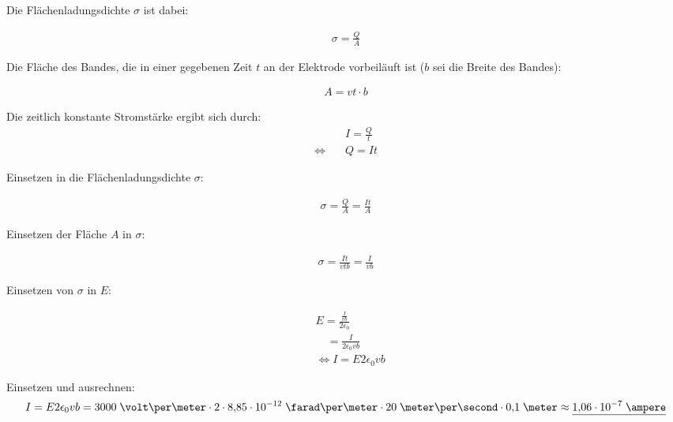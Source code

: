 \documentclass[a4paper,german,12pt,smallheadings]{scrartcl}
\begin{document}
Die Flächenladungsdichte $\sigma$ ist dabei:

\begin{align*}
  \sigma = \frac{Q}{A}
\end{align*}

Die Fläche des Bandes, die in einer gegebenen Zeit $t$ an der Elektrode
vorbeiläuft ist ($b$ sei die Breite des Bandes):

\begin{align*}
  A = vt \cdot b
\end{align*}

Die zeitlich konstante Stromstärke ergibt sich durch:
\begin{align*}
  &I = \frac{Q}{t} \\
  \Leftrightarrow \quad &Q = It
\end{align*}

Einsetzen in die Flächenladungsdichte $\sigma$:

\begin{align*}
  \sigma = \frac{Q}{A} = \frac{It}{A}
\end{align*}

Einsetzen der Fläche $A$ in $\sigma$:

\begin{align*}
  \sigma = \frac{It}{vtb} = \frac{I}{vb} 
\end{align*}

Einsetzen von $\sigma$ in $E$:

\begin{align*}
  &E = \frac{\frac{I}{vb}}{2 \epsilon_0} \\
  &\quad = \frac{I}{2 \epsilon_0 vb} \\
  &\Leftrightarrow I = E 2\epsilon_0 vb
\end{align*}

Einsetzen und ausrechnen:
\begin{align*}
  I = E 2 \epsilon_0 v b = 3000\;\volt\per\meter \cdot 2 \cdot 8{,}85\cdot10^{-12}\;\farad\per\meter \cdot 20\;\meter\per\second \cdot 0{,}1\;\meter \approx \underline{1{,}06 \cdot 10^{-7}\;\ampere}
\end{align*}
\end{document}
